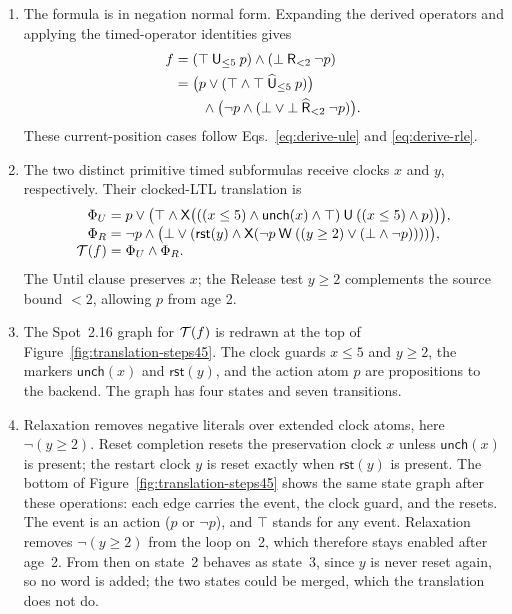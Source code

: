 \begin{enumerate}[label=Step~\arabic*:,leftmargin=*]
\item The formula is in negation normal form. Expanding the derived operators
and applying the timed-operator identities gives
\[
\begin{aligned}
f
 &= (\top\mathbin{\mathsf{U}}_{\le5}p)\land(\bot\mathbin{\mathsf{R}}_{<2}\neg p)\\
 &= \bigl(p\lor(\top\land\top\mathbin{\widehat{\mathsf{U}}}_{\le5}p)\bigr)\\
 &\qquad\land\bigl(\neg p\land(\bot\lor\bot\mathbin{\widehat{\mathsf{R}}}_{<2}\neg p)\bigr).
\end{aligned}
\]
These current-position cases follow Eqs.~\eqref{eq:derive-ule} and
\eqref{eq:derive-rle}.

\item The two distinct primitive timed subformulas receive clocks $x$ and
$y$, respectively. Their clocked-LTL translation is
\begingroup\small
\begin{align*}
\Phi_U={}&p\lor\bigl(\top\land\mathsf{X}\bigl(((x\le5)\land\mathsf{unch}(x)\land\top)\mathbin{\mathsf{U}}((x\le5)\land p)\bigr)\bigr),\\[-1mm]
\Phi_R={}&\neg p\land\bigl(\bot\lor(\mathsf{rst}(y)\land\mathsf{X}(\neg p\mathbin{\mathsf{W}}((y\ge2)\lor(\bot\land\neg p))))\bigr),\\[-1mm]
\mathcal{T}(f)={}&\Phi_U\land\Phi_R.
\end{align*}
\endgroup
The Until clause preserves $x$; the Release test $y\ge2$ complements the source
bound $<2$, allowing $p$ from age 2.

\item The Spot~2.16 graph for $\mathcal{T}(f)$ is redrawn at the top of
Figure~\ref{fig:translation-steps45}. The clock guards $x\le5$ and
$y\ge2$, the markers $\mathsf{unch}(x)$ and $\mathsf{rst}(y)$, and the action
atom $p$ are propositions to the backend. The graph has four
states and seven transitions.

\item Relaxation removes negative literals over extended clock atoms, here
$\neg(y\ge2)$. Reset completion resets the preservation clock $x$ unless
$\mathsf{unch}(x)$ is present; the restart clock $y$ is reset exactly when
$\mathsf{rst}(y)$ is present. The bottom of
Figure~\ref{fig:translation-steps45} shows the same state graph after these
operations: each edge carries the event, the clock guard, and the resets. The
event is an action ($p$ or $\neg p$), and $\top$ stands for any event.
Relaxation removes $\neg(y\ge2)$ from the loop on~2, which therefore stays
enabled after age~2. From then on state~2 behaves as state~3, since $y$ is
never reset again, so no word is added; the two states could be merged, which
the translation does not do.
\end{enumerate}

